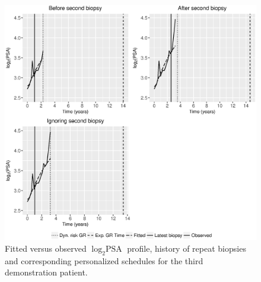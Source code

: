 \begin{figure}
\centerline{\includegraphics[width=\columnwidth]{images/prias_demo/case_2340_t3.eps}}
\caption{Fitted versus observed $\log_2 \mbox{PSA}$ profile, history of repeat biopsies and corresponding personalized schedules for the third demonstration patient.}
\label{web_fig : prias_demo_pid_2340}
\end{figure}